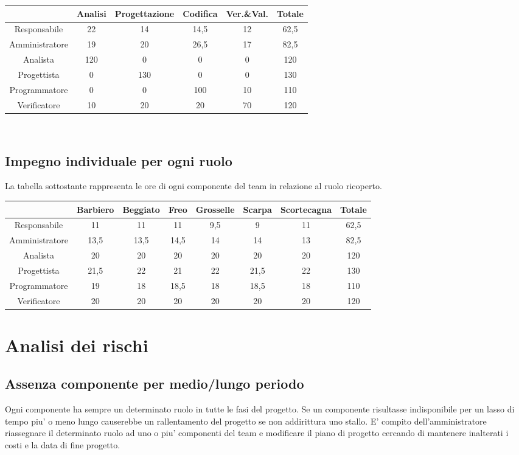 \documentclass[11pt,a4paper]{article}
\begin{document}
\begin{tabular}{|c|c|c|c|c|c|}
\hline
 & Analisi & Progettazione & Codifica & Ver.\&Val. & Totale \\ \hline
Responsabile & 22 & 14 & 14,5 & 12 & 62,5 \\ \hline
Amministratore & 19 & 20 & 26,5 & 17 & 82,5 \\ \hline
Analista & 120 & 0 & 0 & 0 & 120 \\ \hline
Progettista & 0 & 130 & 0 & 0 & 130 \\ \hline
Programmatore & 0 & 0 & 100 & 10 & 110 \\ \hline
Verificatore & 10 & 20 & 20 & 70 & 120 \\ \hline
\end{tabular}
\\

\subsection{Impegno individuale per ogni ruolo}
La tabella sottostante rappresenta le ore di ogni componente del team in relazione al ruolo ricoperto.\\

\begin{tabular}{|c|c|c|c|c|c|c|c|}
\hline
 & Barbiero & Beggiato & Freo & Grosselle & Scarpa & Scortecagna & Totale \\ \hline
Responsabile & 11 & 11 & 11 & 9,5 & 9 & 11 & 62,5 \\ \hline
Amministratore & 13,5 & 13,5 & 14,5 & 14 & 14 & 13 & 82,5 \\ \hline
Analista & 20 & 20 & 20 & 20 & 20 & 20 & 120 \\ \hline
Progettista & 21,5 & 22 & 21 & 22 & 21,5 & 22 & 130 \\ \hline
Programmatore & 19 & 18 & 18,5 & 18 & 18,5 & 18 & 110 \\ \hline
Verificatore & 20 & 20 & 20 & 20 & 20 & 20 & 120 \\ \hline
\end{tabular}

\section{Analisi dei rischi}
\subsection{Assenza componente per medio/lungo periodo}
Ogni componente ha sempre un determinato ruolo in tutte le fasi del progetto.
Se un componente risultasse indisponibile per un lasso di tempo piu' o meno lungo causerebbe un rallentamento del progetto se non addirittura uno stallo.
E' compito dell'amministratore riassegnare il determinato ruolo ad uno o piu' componenti del team e modificare il piano di progetto cercando di mantenere inalterati i costi e la data di fine progetto.
\end{document}

